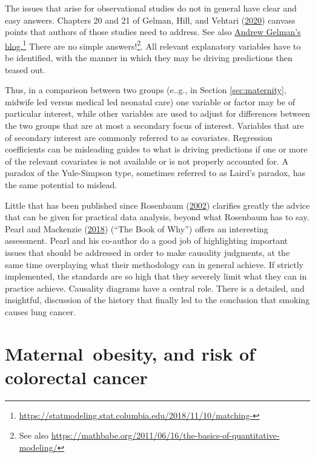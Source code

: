 \documentclass[
  10pt,
  b5paper]{book}
\begin{document}
The issues that arise for observational studies do not in general have
clear and easy answers. Chapters 20 and 21 of Gelman, Hill, and Vehtari (\protect\hyperlink{ref-gelman2020regression}{2020})
canvass points that authors of those studies need to address. See also
\href{https://statmodeling.stat.columbia.edu/2018/11/10/matching-discarding-non-matches-deal-lack-complete-overlap-regression-adjust-imbalance-treatment-control-groups/}{Andrew Gelman's blog.}\footnote{\url{https://statmodeling.stat.columbia.edu/2018/11/10/matching-}} There are no simple
answers!\footnote{See also \url{https://mathbabe.org/2011/06/16/the-basics-of-quantitative-modeling/}}. All relevant explanatory variables have to be identified,
with the manner in which they may be driving predictions then
teased out.

Thus, in a comparison between two groups (e..g., in Section
\ref{sec:maternity}, midwife led versus medical led neonatal
care) one variable or factor may be of particular interest, while
other variables are used to adjust for differences between the
two groups that are at most a secondary focus of interest.
Variables that are of secondary interest are commonly referred to
as covariates. Regression coefficients can be misleading guides
to what is driving predictions if one or more of the relevant
covariates is not available or is not properly accounted for. A
paradox of the Yule-Simpson type, sometimes referred to as
Laird's paradox, has the same potential to mislead.

Little that has been published since Rosenbaum (\protect\hyperlink{ref-RosBook}{2002}) clarifies greatly the
advice that can be given for practical data analysis, beyond what
Rosenbaum has to say. Pearl and Mackenzie (\protect\hyperlink{ref-pearl2018book}{2018}) (``The Book of Why'') offers an
interesting assessment. Pearl and his co-author do a good job of
highlighting important issues that should be addressed in order to
make causality judgments, at the same time overplaying what their
methodology can in general achieve. If strictly implemented,
the standards are so high that they severely limit what they can
in practice achieve. Causality diagrams have a central role.
There is a detailed, and insightful, discussion of the history
that finally led to the conclusion that smoking causes lung cancer.

\hypertarget{maternal-obesity-and-risk-of-colorectal-cancer}{%
\section{Maternal~obesity, and risk of colorectal cancer}\label{maternal-obesity-and-risk-of-colorectal-cancer}}
\end{document}

